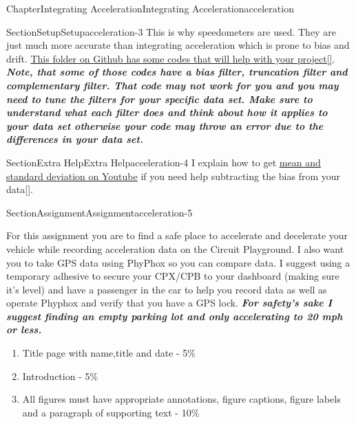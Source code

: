 \documentclass[oneside,10pt,]{book}
\newcommand{\xreffont}{\relax}
\newcommand{\linkhilite}[1]{\underline{#1}}
\newcommand{\alert}[1]{\textbf{\textit{#1}}}
\numberwithin{equation}{section}
\begin{document}
\begin{chapterptx}{Chapter}{Integrating Acceleration}{}{Integrating Acceleration}{}{}{acceleration}
\begin{sectionptx}{Section}{Setup}{}{Setup}{}{}{acceleration-3}
This is why speedometers are used. They are just much more accurate than integrating acceleration which is prone to bias and drift. \href{https://github.com/cmontalvo251/Microcontrollers/blob/master/Circuit_Playground/CircuitPython/cpx_assignments/Velocity_from_Acceleration/velocity_from_acceleration.py}{\linkhilite{This folder on Github has some codes that will help with your project}}\hyperlink{Github}{\linkhilite{[{\xreffont 33}]}}. \alert{Note, that some of those codes have a bias filter, truncation filter and complementary filter. That code may not work for you and you may need to tune the filters for your specific data set. Make sure to understand what each filter does and think about how it applies to your data set otherwise your code may throw an error due to the differences in your data set.}%
\end{sectionptx}
%
%
\typeout{************************************************}
\typeout{************************************************}
%
\begin{sectionptx}{Section}{Extra Help}{}{Extra Help}{}{}{acceleration-4}
I explain how to get \href{https://www.youtube.com/watch?v=e4xs9Ky7_YI\&feature=youtu.be}{\linkhilite{mean and standard deviation on Youtube}} if you need help subtracting the bias from your data\hyperlink{youtube}{\linkhilite{[{\xreffont 50}]}}.%
\end{sectionptx}
%
%
\typeout{************************************************}
\typeout{************************************************}
%
\begin{sectionptx}{Section}{Assignment}{}{Assignment}{}{}{acceleration-5}
\begin{introduction}{}%
For this assignment you are to find a safe place to accelerate and decelerate your vehicle while recording acceleration data on the Circuit Playground. I also want you to take GPS data using PhyPhox so you can compare data. I suggest using a temporary adhesive to secure your CPX\slash{}CPB to your dashboard (making sure it's level) and have a passenger in the car to help you record data as well as operate Phyphox and verify that you have a GPS lock. \alert{For safety's sake I suggest finding an empty parking lot and only accelerating to 20 mph or less.}%
\begin{enumerate}
\item{}Title page with name,title and date - 5\%%
\item{}Introduction - 5\%%
\item{}All figures must have appropriate annotations, figure captions, figure labels and a paragraph of supporting text - 10\%%

\end{enumerate}
\end{introduction}
\end{sectionptx}
\end{chapterptx}
\end{document}
